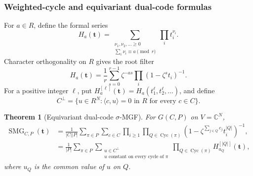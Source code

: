 \documentclass[10pt]{article}
\newcommand{\SMG}{\operatorname{SMG}}
\newcommand{\MGF}{\SMG}
\newcommand{\C}{\mathbb C}
\newcommand{\Cyc}{\operatorname{Cyc}}
\newtheorem{theorem}{Theorem}
\begin{document}
\subsubsection{Weighted-cycle and equivariant dual-code formulas}

For $a\in R$, define the formal series
\begin{equation}\label{nd:code_monomial:eq:H-def}
 H_a(\mathbf t)=
 \sum_{\substack{\nu_1,\nu_2,\ldots\geq0\\
                  \sum_i\nu_i\equiv a\pmod r}}
 \prod_i t_i^{\nu_i}.
\end{equation}
Character orthogonality on $R$ gives the root filter
\begin{equation}\label{nd:code_monomial:eq:H-filter}
 \boxed{H_a(\mathbf t)=\frac1r\sum_{s=0}^{r-1}
 \zeta^{-as}\prod_i(1-\zeta^s t_i)^{-1}.}
\end{equation}
For a positive integer $\ell$, put
$H_a^{[\ell]}(\mathbf t)=H_a(t_1^\ell,t_2^\ell,\ldots)$, and define
\[
 C^\perp=\{u\in R^N:\langle c,u\rangle=0\text{ in }R
                         \text{ for every }c\in C\}.
\]

\begin{theorem}[Equivariant dual-code $\sigma$-MGF]\label{nd:code_monomial:thm:main}
For $G(C,P)$ on $V=\C^N$,
\begin{align}
 \MGF_{C,P}(\mathbf t)
 &=\frac1{|C||P|}\sum_{\pi\in P}\sum_{c\in C}
   \prod_{i\geq1}\prod_{Q\in\Cyc(\pi)}
   \left(1-\zeta^{\sum_{j\in Q}c_j}t_i^{|Q|}\right)^{-1},
   \label{nd:code_monomial:eq:weighted-cycle}\\
 &=\frac1{|P|}\sum_{\pi\in P}
   \sum_{\substack{u\in C^\perp\\
                    u\text{ constant on every cycle of }\pi}}
   \prod_{Q\in\Cyc(\pi)}H_{u_Q}^{[|Q|]}(\mathbf t),
   \label{nd:code_monomial:eq:dual-cycle}
\end{align}
where $u_Q$ is the common value of $u$ on $Q$.
\end{theorem}
\end{document}
